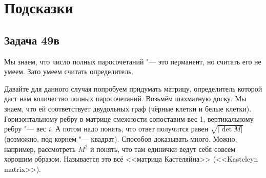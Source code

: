 \section{Подсказки}
\subsection{Задача 49в}
	Мы знаем, что число полных паросочетаний "--- это перманент, но считать его не умеем.
	Зато умеем считать определитель.

	Давайте для данного случая попробуем придумать матрицу, определитель которой даст нам количество полных паросочетаний.
	Возьмём шахматную доску.
	Мы знаем, что ей соответствует двудольных граф (чёрные клетки и белые клетки).
	Горизонтальному ребру в матрице смежности сопоставим вес 1, вертикальному ребру "--- вес $i$.
	А потом надо понять, что ответ получится равен $\sqrt{|\det M|}$ (возможно, под корнем "--- квадрат).
	Способов доказывать много.
	Можно, например, рассмотреть $M^2$ и понять, что там единички ведут себя совсем хорошим образом.
	Называется это всё <<матрица Кастеляйна>> (<<Kasteleyn matrix>>).
